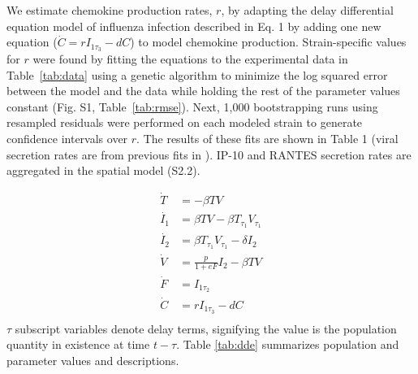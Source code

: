 \documentclass[preprint,10pt,numbers]{elsarticle}
\newcommand{\new}[1]{{\color{dkgreen}#1}}
\begin{document}
We estimate chemokine production rates, $r$, by adapting the delay differential equation model of influenza infection described in \citep{Mitchell2011} Eq. 1 by adding one new equation ($\dot{C}=r I_{1 \tau_3}-dC$) to model chemokine production.   Strain-specific values for $r$ were found by fitting the equations to the experimental data in Table~\ref{tab:data} using a genetic algorithm to minimize the log squared error between the model and the data while holding the rest of the parameter values constant \new{(Fig. S1, Table~\ref{tab:rmse})}.  Next, 1,000 bootstrapping runs using resampled residuals were performed on each modeled strain to generate confidence intervals over $r$.  The results of these fits are shown in Table 1 (viral secretion rates are from previous fits in \cite{Mitchell2011}).  IP-10 and RANTES secretion rates are aggregated in the spatial model (S2.2).

{\footnotesize
\begin{equation*}
\begin{aligned}
\dot{T} &= - \beta T V \\
\dot{I_1} &= \beta T V - \beta T_{\tau_1}V_{\tau_1} \\
\dot{I_2} &= \beta T_{\tau_1}V_{\tau_1} - \delta I_2 \\
\dot{V} &= \frac{p}{1+eF} I_2  - \beta T V  \\
\dot{F} &=  I_{1 \tau_2} \\
\dot{C} &= r I_{1 \tau_3} - d C \\
\end{aligned}
\tag{Eq. 1}
\label{eq:dde}
\end{equation*}
\vspace{.05in}
}
$\tau$ subscript variables denote delay terms, signifying the value is the population quantity in existence at time $t - \tau$.  Table \ref{tab:dde} summarizes population and parameter values and descriptions.  



\end{document}
